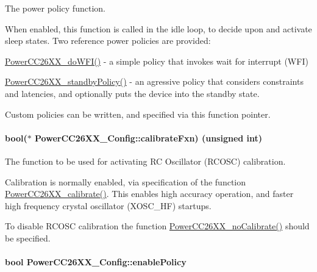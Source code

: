 The power policy function. 

When enabled, this function is called in the idle loop, to decide upon and activate sleep states. Two reference power policies are provided\+:

\hyperlink{_power_c_c26_x_x_8h_ad4ff77b3854dd494aac42e42f70bdee7}{Power\+C\+C26\+X\+X\+\_\+do\+W\+F\+I()} -\/ a simple policy that invokes wait for interrupt (W\+F\+I)

\hyperlink{_power_c_c26_x_x_8h_aea49c1a01cb045b1ce6be1ecb3587498}{Power\+C\+C26\+X\+X\+\_\+standby\+Policy()} -\/ an agressive policy that considers constraints and latencies, and optionally puts the device into the standby state.

Custom policies can be written, and specified via this function pointer. 
\paragraph[{calibrate\+Fxn}]{\setlength{\rightskip}{0pt plus 5cm}bool($\ast$ Power\+C\+C26\+X\+X\+\_\+\+Config\+::calibrate\+Fxn) (unsigned int)}\label{struct_power_c_c26_x_x___config_a92f68736067cceef7bbc32408b5bec96}


The function to be used for activating R\+C Oscillator (R\+C\+O\+S\+C) calibration. 

Calibration is normally enabled, via specification of the function \hyperlink{_power_c_c26_x_x_8h_a27a4c7312d5cf59eb699ad5f87104408}{Power\+C\+C26\+X\+X\+\_\+calibrate()}. This enables high accuracy operation, and faster high frequency crystal oscillator (X\+O\+S\+C\+\_\+\+H\+F) startups.

To disable R\+C\+O\+S\+C calibration the function \hyperlink{_power_c_c26_x_x_8h_a39c82b7c57a1b5c013f5e285e98232e9}{Power\+C\+C26\+X\+X\+\_\+no\+Calibrate()} should be specified. 
\paragraph[{enable\+Policy}]{\setlength{\rightskip}{0pt plus 5cm}bool Power\+C\+C26\+X\+X\+\_\+\+Config\+::enable\+Policy}\label{struct_power_c_c26_x_x___config_a0dabcd65e4700189af683ce0f54e8479}


